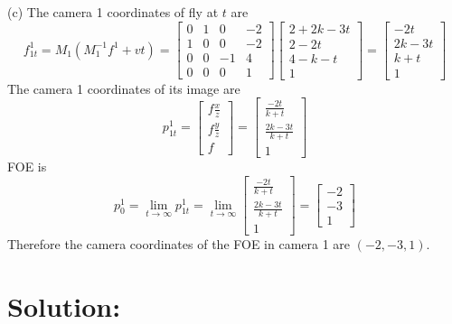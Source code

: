 \documentclass[12pt]{article}
\begin{document}
\noindent (c) The camera 1 coordinates of fly at $t$ are  
\begin{equation*}
f_{1t}^1 = M_1 \left ( M_1^{-1}f^1 + vt \right ) = \left[ \begin{array}{cccc}
0 & 1 & 0 & -2\\
1 & 0 & 0 & -2\\
0 & 0 & -1 & 4\\
0 & 0 & 0 & 1
\end{array} \right] \left[ \begin{array}{c}
2 + 2k - 3t\\
2 - 2t\\
4 - k - t\\
1
\end{array} \right] = \left[ \begin{array}{c}
-2t\\
2k-3t\\
k+t\\
1
\end{array} \right]
\end{equation*}
The camera 1 coordinates of its image are 
\begin{equation*}
p_{1t}^1 = \left[ \begin{array}{c}
f\frac{x}{z}\\
f\frac{y}{z}\\
f
\end{array} \right]  = \left[ \begin{array}{c}
\frac{-2t}{k+t}\\
\frac{2k-3t}{k+t}\\
1
\end{array} \right]
\end{equation*}
FOE is 
\begin{equation*}
p^1_0 = \lim\limits_{t\to\infty}p_{1t}^1 = \lim\limits_{t\to\infty} \left[ \begin{array}{c}
\frac{-2t}{k+t}\\
\frac{2k-3t}{k+t}\\
1
\end{array} \right] = \left[ \begin{array}{c}
-2\\
-3\\
1
\end{array} \right]
\end{equation*}
Therefore the camera coordinates of the FOE in camera 1 are $(-2, -3, 1)$.


\section{Solution:}
\end{document}
